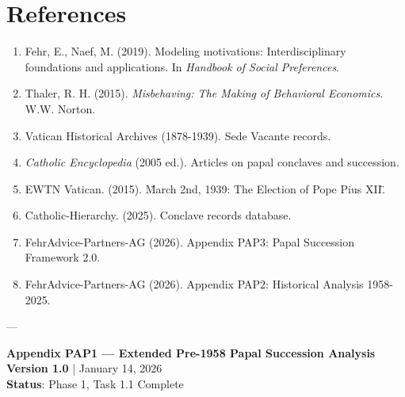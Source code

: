 \section{References}

\nocite{bcm_master}


\small

\begin{enumerate}
    \item Fehr, E., Naef, M. (2019). Modeling motivations: Interdisciplinary foundations and applications. In \textit{Handbook of Social Preferences}.
    \item Thaler, R. H. (2015). \textit{Misbehaving: The Making of Behavioral Economics}. W.W. Norton.
    \item Vatican Historical Archives (1878-1939). Sede Vacante records.
    \item \textit{Catholic Encyclopedia} (2005 ed.). Articles on papal conclaves and succession.
    \item EWTN Vatican. (2015). \"March 2nd, 1939: The Election of Pope Pius XII.\"
    \item Catholic-Hierarchy. (2025). Conclave records database.
    \item FehrAdvice-Partners-AG (2026). Appendix PAP3: Papal Succession Framework 2.0.
    \item FehrAdvice-Partners-AG (2026). Appendix PAP2: Historical Analysis 1958-2025.
\end{enumerate}

---

\textbf{Appendix PAP1 --- Extended Pre-1958 Papal Succession Analysis}\\
\textbf{Version 1.0} | January 14, 2026\\
\textbf{Status}: Phase 1, Task 1.1 Complete


